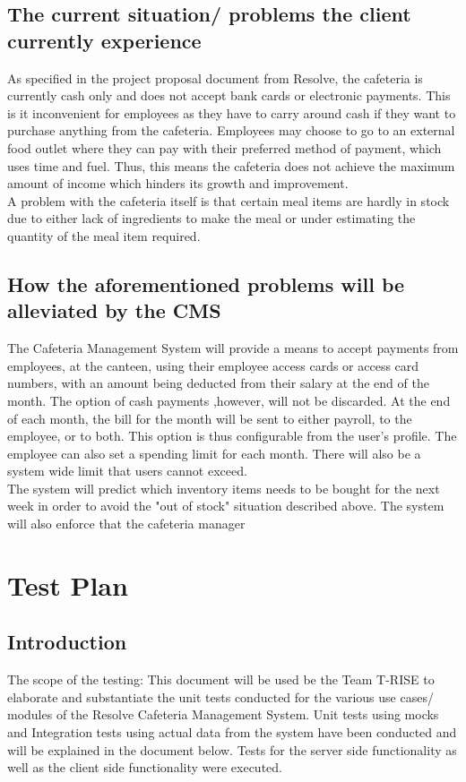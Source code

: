 \documentclass[a4paper,12pt]{article}
\begin{document}
\subsection{The current situation/ problems the client currently experience}
As specified in the project proposal document from Resolve, the cafeteria is currently cash only and does not accept bank cards or electronic payments. This is it inconvenient for employees as they have to carry around cash if they want to purchase anything from the cafeteria. Employees may choose to go to an external food outlet where they can pay with their preferred method of payment, which uses time and fuel. Thus, this means the cafeteria does not achieve the maximum amount of income which hinders its growth and improvement.\\ A problem with the cafeteria itself is that certain meal items are hardly in stock due to either lack of ingredients to make the meal or under estimating the quantity of the meal item required.

\subsection{How the aforementioned problems will be alleviated by the CMS}
The Cafeteria Management System will provide a means to accept payments from employees, at the canteen, using their employee access cards or access card numbers, with an amount being deducted from their salary at the end of the month.  The option of cash payments ,however, will not be discarded. At the end of each month, the bill for the month will be sent to either payroll, to the employee, or to both. This option is thus configurable from the user's profile. The employee can also set a spending limit for each month. There will also be a system wide limit that users cannot exceed.
\\
The system will predict which inventory items needs to be bought for the next week in order to avoid the "out of stock" situation described above. The system will also enforce that the cafeteria manager 
\\
\section{Test Plan}

\subsection{Introduction}
The scope of the testing: This document will be used be the Team T-RISE to elaborate and substantiate the unit tests conducted for the various use cases/ modules of the Resolve Cafeteria Management System. Unit tests using mocks and Integration tests using actual data from the system have been conducted and will be explained in the document below. Tests for the server side functionality as well as the client side functionality were executed.
\end{document}
